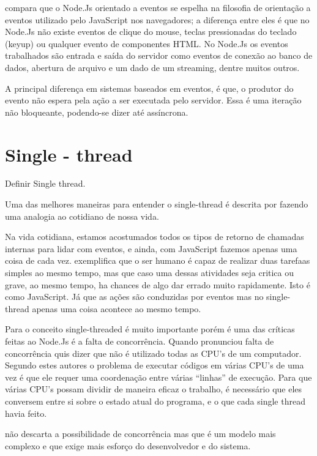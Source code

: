    compara que o Node.Js orientado a eventos se espelha na filosofia de orientação 
  a eventos utilizado pelo JavaScript nos navegadores; a diferença entre eles é que no Node.Js 
  não existe eventos de clique do mouse, teclas pressionadas do teclado (keyup) ou qualquer evento de componentes HTML.
  No Node.Js os eventos trabalhados são entrada e saída do servidor como eventos de conexão 
  ao banco de dados, abertura de arquivo e um dado de um streaming, dentre muitos outros.
  
  A principal diferença em sistemas baseados em eventos, é que, o produtor do evento não espera pela ação a ser executada
  pelo servidor. Essa é uma iteração não bloqueante, podendo-se dizer até assíncrona. \cite{Junior:2012}   


\section{Single - thread}
\label{single-thread}

  Definir Single thread.
  
  Uma das melhores maneiras para entender o single-thread é descrita por 
  fazendo uma analogia ao cotidiano de nossa vida.
  
  Na vida cotidiana, estamos acostumados todos os tipos de retorno de chamadas internas para lidar com eventos, 
  e ainda, com JavaScript fazemos apenas uma coisa de cada vez. 
   exemplifica que o ser humano é capaz de realizar duas tarefaas simples ao mesmo tempo,
  mas que caso uma dessas atividades seja critica ou grave, ao mesmo tempo, ha chances de algo dar errado muito rapidamente. 
  Isto é como JavaScript. Já que as ações são conduzidas por eventos mas no single-thread apenas uma coisa 
  acontece ao mesmo tempo.
  
  Para  o conceito single-threaded é muito importante porém é uma das críticas 
  feitas ao Node.Js é a falta de concorrência. Quando  pronunciou falta de concorrência 
  quis dizer que não é utilizado todas as CPU’s de um computador. 
  Segundo estes autores o problema de executar códigos em várias CPU’s de uma vez é que ele requer 
  uma coordenação entre várias “linhas” de execução. Para que várias CPU’s possam dividir de maneira eficaz o trabalho, 
  é necessário que eles conversem entre si sobre o estado atual do programa, e o que cada single thread havia feito.

   não descarta a possibilidade de concorrência mas que é um modelo mais complexo e que exige mais esforço 
  do desenvolvedor e do sistema.
  
